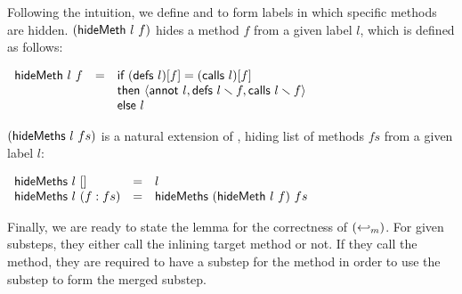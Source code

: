 Following the intuition, we define \hidemethsym{} and \hidemethssym{}
to form labels in which specific methods are
hidden. $(\textsf{hideMeth}{}\ l\ f)$ hides a method $f$ from a given label $l$,
which is defined as follows:
\begin{definition}
  \label{def-hidemeth}
  \mbox{}
  \begin{center}
    \begin{math}
      \begin{array}{lcl}
        \textsf{hideMeth}{}\ l\ f & = & \textsf{if}\ {} (\textsf{defs}\ l)[f] = (\textsf{calls}\ l)[f] \\
        & & \textsf{then}\ {} \langle \textsf{annot}\ l, \textsf{defs}\ l \smallsetminus{} f, \textsf{calls}\ l \smallsetminus{} f \rangle \\
        & & \textsf{else}\ {} l
      \end{array}
    \end{math}
  \end{center}
\end{definition}
$(\textsf{hideMeths}{}\ l\ fs)$ is a natural extension of \hidemethsym{}, hiding
list of methods $fs$ from a given label $l$:
\begin{definition}
  \label{def-hidemeths}
  \mbox{}
  \begin{center}
    \begin{math}
      \begin{array}{lcl}
        \textsf{hideMeths}{}\ l\ [] & = & l \\
        \textsf{hideMeths}{}\ l\ (f : fs) & = & \textsf{hideMeths}{}\ (\textsf{hideMeth}{}\ l\ f)\ fs
      \end{array}
    \end{math}
  \end{center}
\end{definition}

Finally, we are ready to state the lemma for the correctness of
$(\hookleftarrow_{m})$. For given substeps, they either call the inlining
target method or not. If they call the method, they are required to
have a substep for the method in order to use the substep to form the
merged substep.

